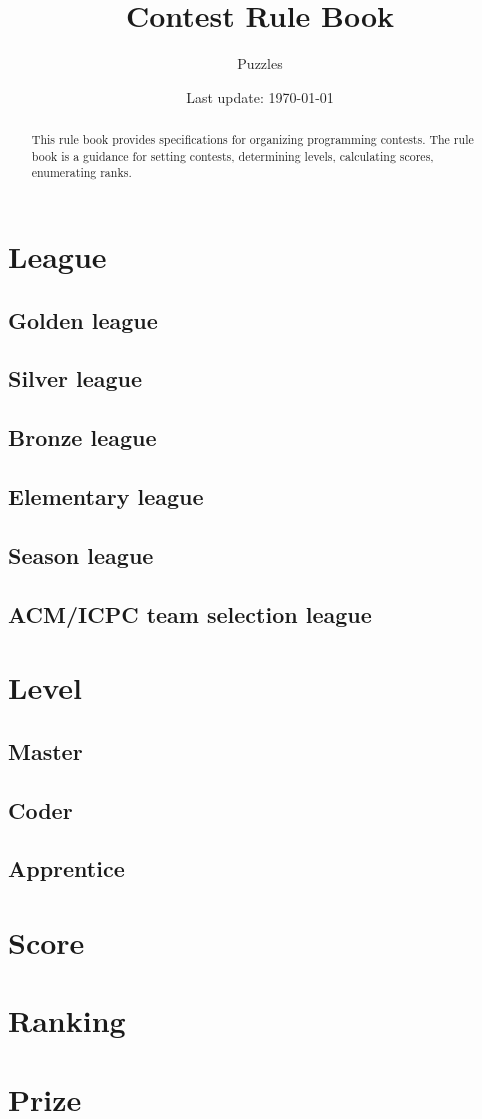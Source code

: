 \documentclass{article}
\title{\textbf{Contest Rule Book}}
\author{Puzzles}
\date{Last update: \today}
\begin{document}
\maketitle

\begin{abstract}
This rule book provides specifications for organizing programming contests. The rule book is a guidance for setting contests, determining levels, calculating scores, enumerating ranks.
\end{abstract}

\section{League}

\subsection{Golden league}

\subsection{Silver league}

\subsection{Bronze league}

\subsection{Elementary league}

\subsection{Season league}

\subsection{ACM/ICPC team selection league}

\section{Level}

\subsection{Master}

\subsection{Coder}

\subsection{Apprentice}

\section{Score}

\section{Ranking}

\section{Prize}
\end{document}

